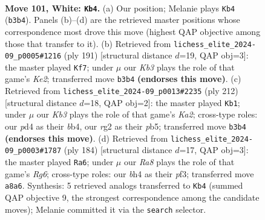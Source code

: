 \documentclass[11pt]{article}
\begin{document}
\clearpage

\begin{figure}[p]\centering
\begin{subfigure}{0.46\textwidth}\centering
\resizebox{\linewidth}{!}{%
\newchessgame
\chessboard[
  setfen={R7/7n/7p/4p2k/3p3b/1K6/6r1/8 w - - 20 101},
  showmover=false,
  pgfstyle=straightmove, color=movearrow, markmove={b3-b4}
]}
\caption{}
\end{subfigure}\hfill
\begin{subfigure}{0.46\textwidth}\centering
\resizebox{\linewidth}{!}{%
\newchessgame
\chessboard[
  setfen={8/4k3/6R1/6Pp/4BK1P/8/8/2r5 b - - 0 96},
  showmover=false,
  pgfstyle=straightmove, color=movearrow, markmove={e7-f7}
]}
\caption{}
\end{subfigure}
\\[4pt]
\begin{subfigure}{0.46\textwidth}\centering
\resizebox{\linewidth}{!}{%
\newchessgame
\chessboard[
  setfen={8/8/6k1/pp4pp/1b6/8/K7/8 w - - 4 107},
  showmover=false,
  pgfstyle=straightmove, color=movearrow, markmove={a2-b1}
]}
\caption{}
\end{subfigure}\hfill
\begin{subfigure}{0.46\textwidth}\centering
\resizebox{\linewidth}{!}{%
\newchessgame
\chessboard[
  setfen={8/8/6R1/5p2/5k2/5p2/1r6/4K3 w - - 42 93},
  showmover=false,
  pgfstyle=straightmove, color=movearrow, markmove={g6-a6}
]}
\caption{}
\end{subfigure}
\caption{\textbf{Move 101, White: \texttt{Kb4}.} (a) Our position; Melanie plays \texttt{Kb4} (\texttt{b3b4}). Panels (b)--(d) are the retrieved master positions whose correspondence most drove this move (highest QAP objective among those that transfer to it). (b) Retrieved from \texttt{lichess\_elite\_2024-09\_p0005\#1216} (ply 191) [structural distance $d$=19, QAP obj=3]: the master played \texttt{Kf7}; under $\mu$ our \emph{Kb3} plays the role of that game's \emph{Ke2}; transferred move \texttt{b3b4} \textbf{(endorses this move)}. (c) Retrieved from \texttt{lichess\_elite\_2024-09\_p0013\#2235} (ply 212) [structural distance $d$=18, QAP obj=2]: the master played \texttt{Kb1}; under $\mu$ our \emph{Kb3} plays the role of that game's \emph{Ka2}; cross-type roles: our \emph{p}d4 as their \emph{b}b4, our \emph{r}g2 as their \emph{p}b5; transferred move \texttt{b3b4} \textbf{(endorses this move)}. (d) Retrieved from \texttt{lichess\_elite\_2024-09\_p0003\#1787} (ply 184) [structural distance $d$=17, QAP obj=3]: the master played \texttt{Ra6}; under $\mu$ our \emph{Ra8} plays the role of that game's \emph{Rg6}; cross-type roles: our \emph{b}h4 as their \emph{p}f3; transferred move \texttt{a8a6}. Synthesis: 5 retrieved analogs transferred to \texttt{Kb4} (summed QAP objective 9, the strongest correspondence among the candidate moves); Melanie committed it via the \texttt{search} selector.}
\label{fig:thought-m200}
\end{figure}
\end{document}
